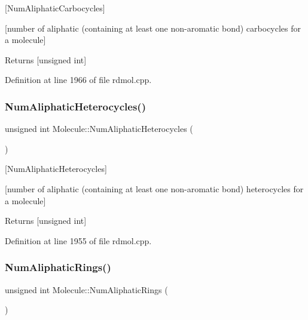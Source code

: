 \mbox{[}Num\+Aliphatic\+Carbocycles\mbox{]} 

\mbox{[}number of aliphatic (containing at least one non-\/aromatic bond) carbocycles for a molecule\mbox{]}

\begin{DoxyReturn}{Returns}
\mbox{[}unsigned int\mbox{]} 
\end{DoxyReturn}


Definition at line 1966 of file rdmol.\+cpp.

\mbox{\label{class_molecule_a9c5af0a753b98601782bb2d98021793a}} 
\subsubsection{\texorpdfstring{Num\+Aliphatic\+Heterocycles()}{NumAliphaticHeterocycles()}}
{\footnotesize\ttfamily unsigned int Molecule\+::\+Num\+Aliphatic\+Heterocycles (\begin{DoxyParamCaption}{ }\end{DoxyParamCaption})}



\mbox{[}Num\+Aliphatic\+Heterocycles\mbox{]} 

\mbox{[}number of aliphatic (containing at least one non-\/aromatic bond) heterocycles for a molecule\mbox{]}

\begin{DoxyReturn}{Returns}
\mbox{[}unsigned int\mbox{]} 
\end{DoxyReturn}


Definition at line 1955 of file rdmol.\+cpp.

\mbox{\label{class_molecule_a6170e58d6f19e2023378975bcf93c8d7}} 
\subsubsection{\texorpdfstring{Num\+Aliphatic\+Rings()}{NumAliphaticRings()}}
{\footnotesize\ttfamily unsigned int Molecule\+::\+Num\+Aliphatic\+Rings (\begin{DoxyParamCaption}{ }\end{DoxyParamCaption})}



